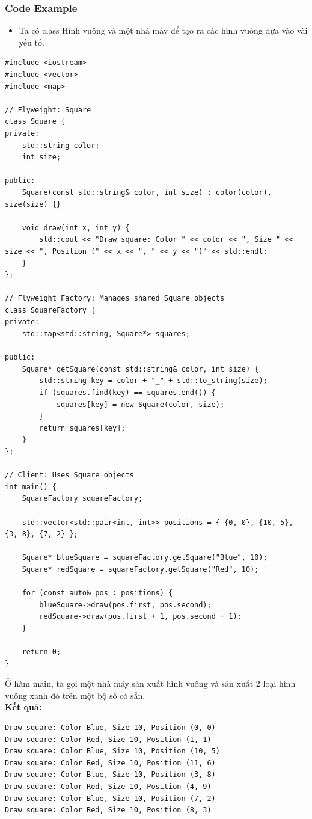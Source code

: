 \subsubsection{Code Example}
\begin{itemize}
    \item Ta có class Hình vuông và một nhà máy để tạo ra các hình vuông dựa vào vài yếu tố.
\end{itemize}
\begin{lstlisting}
#include <iostream>
#include <vector>
#include <map>

// Flyweight: Square
class Square {
private:
    std::string color;
    int size;

public:
    Square(const std::string& color, int size) : color(color), size(size) {}

    void draw(int x, int y) {
        std::cout << "Draw square: Color " << color << ", Size " << size << ", Position (" << x << ", " << y << ")" << std::endl;
    }
};

// Flyweight Factory: Manages shared Square objects
class SquareFactory {
private:
    std::map<std::string, Square*> squares;

public:
    Square* getSquare(const std::string& color, int size) {
        std::string key = color + "_" + std::to_string(size);
        if (squares.find(key) == squares.end()) {
            squares[key] = new Square(color, size);
        }
        return squares[key];
    }
};

// Client: Uses Square objects
int main() {
    SquareFactory squareFactory;

    std::vector<std::pair<int, int>> positions = { {0, 0}, {10, 5}, {3, 8}, {7, 2} };

    Square* blueSquare = squareFactory.getSquare("Blue", 10);
    Square* redSquare = squareFactory.getSquare("Red", 10);

    for (const auto& pos : positions) {
        blueSquare->draw(pos.first, pos.second);
        redSquare->draw(pos.first + 1, pos.second + 1);
    }

    return 0;
}

\end{lstlisting}
Ở hàm main, ta gọi một nhà máy sản xuất hình vuông và sản xuất 2 loại hình vuông xanh đỏ trên một bộ số có sẵn.\\
\newline
\textbf{Kết quả:}
\begin{lstlisting}
Draw square: Color Blue, Size 10, Position (0, 0)
Draw square: Color Red, Size 10, Position (1, 1)
Draw square: Color Blue, Size 10, Position (10, 5)
Draw square: Color Red, Size 10, Position (11, 6)
Draw square: Color Blue, Size 10, Position (3, 8)
Draw square: Color Red, Size 10, Position (4, 9)
Draw square: Color Blue, Size 10, Position (7, 2)
Draw square: Color Red, Size 10, Position (8, 3)
\end{lstlisting}
